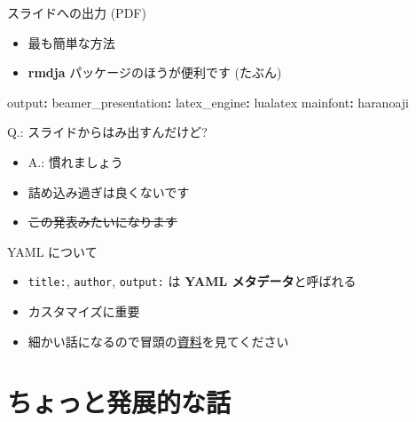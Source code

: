 \documentclass[
  ignorenonframetext,
]{beamer}
\newenvironment{Shaded}{\begin{snugshade}}{\end{snugshade}}
\newcommand{\AttributeTok}[1]{\textcolor[rgb]{0.77,0.63,0.00}{#1}}
\newcommand{\FunctionTok}[1]{\textcolor[rgb]{0.00,0.00,0.00}{#1}}
\newcommand{\KeywordTok}[1]{\textcolor[rgb]{0.13,0.29,0.53}{\textbf{#1}}}
\providecommand{\tightlist}{%
  \setlength{\itemsep}{0pt}\setlength{\parskip}{0pt}}
\begin{document}
\begin{frame}[fragile]{スライドへの出力 (PDF)}
\protect\hypertarget{ux30b9ux30e9ux30a4ux30c9ux3078ux306eux51faux529b-pdf}{}
\begin{itemize}
\tightlist
\item
  最も簡単な方法
\item
  \textbf{rmdja} パッケージのほうが便利です (たぶん)
\end{itemize}

\begin{Shaded}
\begin{Highlighting}[]
\FunctionTok{output}\KeywordTok{:}
\AttributeTok{  }\FunctionTok{beamer\_presentation}\KeywordTok{:}
\AttributeTok{    }\FunctionTok{latex\_engine}\KeywordTok{:}\AttributeTok{ lualatex}
\FunctionTok{mainfont}\KeywordTok{:}\AttributeTok{ haranoaji}
\end{Highlighting}
\end{Shaded}
\end{frame}

\begin{frame}{Q.: スライドからはみ出すんだけど?}
\protect\hypertarget{q.-ux30b9ux30e9ux30a4ux30c9ux304bux3089ux306fux307fux51faux3059ux3093ux3060ux3051ux3069}{}
\begin{itemize}
\tightlist
\item
  A.: 慣れましょう
\item
  詰め込み過ぎは良くないです
\item
  \sout{この発表みたいになります}
\end{itemize}
\end{frame}

\begin{frame}[fragile]{YAML について}
\protect\hypertarget{yaml-ux306bux3064ux3044ux3066}{}
\begin{itemize}
\tightlist
\item
  \texttt{title:}, \texttt{author}, \texttt{output:} は \textbf{YAML メタデータ}と呼ばれる
\item
  カスタマイズに重要
\item
  細かい話になるので冒頭の\href{https://rpubs.com/ktgrstsh/755893}{資料}を見てください
\end{itemize}
\end{frame}

\hypertarget{ux3061ux3087ux3063ux3068ux767aux5c55ux7684ux306aux8a71}{%
\section{ちょっと発展的な話}\label{ux3061ux3087ux3063ux3068ux767aux5c55ux7684ux306aux8a71}}
\end{document}
